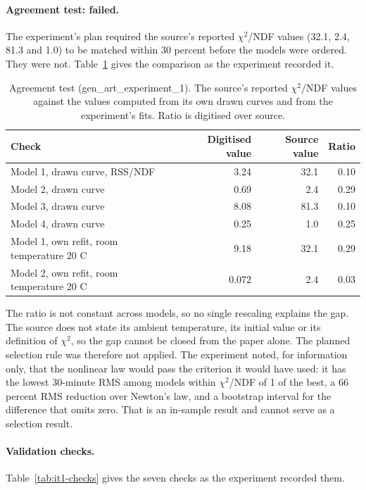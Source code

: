 \documentclass[11pt,letterpaper]{article}
\begin{document}
\paragraph{Agreement test: failed.} The experiment's plan required the source's reported $\chi^2$/NDF values (32.1, 2.4, 81.3 and 1.0) to be matched within 30 percent before the models were ordered. They were not. Table~\ref{tab:it1-agree} gives the comparison as the experiment recorded it.

\begin{table}[!htbp]
\centering
\small
\caption{Agreement test (gen\_art\_experiment\_1). The source's reported $\chi^2$/NDF values against the values computed from its own drawn curves and from the experiment's fits. Ratio is digitised over source.}
\label{tab:it1-agree}
\begin{tabularx}{\linewidth}{Xrrr}
\toprule
Check & Digitised value & Source value & Ratio \\
\midrule
Model 1, drawn curve, RSS/NDF & 3.24 & 32.1 & 0.10 \\
Model 2, drawn curve & 0.69 & 2.4 & 0.29 \\
Model 3, drawn curve & 8.08 & 81.3 & 0.10 \\
Model 4, drawn curve & 0.25 & 1.0 & 0.25 \\
Model 1, own refit, room temperature 20 C & 9.18 & 32.1 & 0.29 \\
Model 2, own refit, room temperature 20 C & 0.072 & 2.4 & 0.03 \\
\bottomrule
\end{tabularx}
\end{table}

The ratio is not constant across models, so no single rescaling explains the gap. The source does not state its ambient temperature, its initial value or its definition of $\chi^2$, so the gap cannot be closed from the paper alone. The planned selection rule was therefore not applied. The experiment noted, for information only, that the nonlinear law would pass the criterion it would have used: it has the lowest 30-minute RMS among models within $\chi^2$/NDF of 1 of the best, a 66 percent RMS reduction over Newton's law, and a bootstrap interval for the difference that omits zero. That is an in-sample result and cannot serve as a selection result.

\paragraph{Validation checks.} Table~\ref{tab:it1-checks} gives the seven checks as the experiment recorded them.
\end{document}
